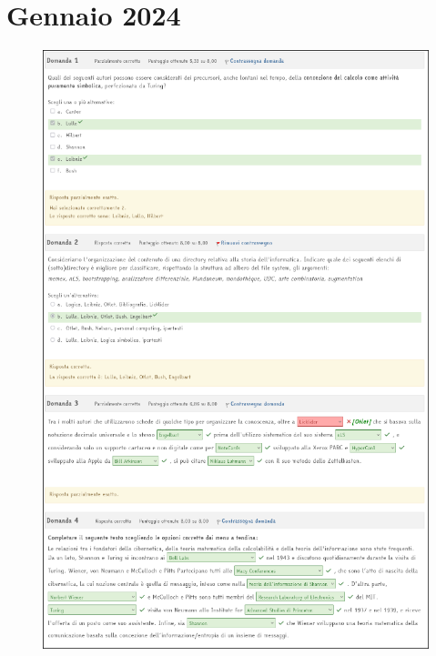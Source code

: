 \chapter{Gennaio 2024}

\begin{figure}[h]
    \centering
    \includegraphics[scale = 0.49]{images/Gennaio2024.png}
\end{figure}